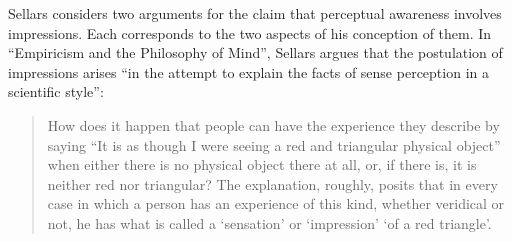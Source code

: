 \documentclass[12pt]{article}
\begin{document}
Sellars considers two arguments for the claim that perceptual awareness involves impressions. Each corresponds to the two aspects of his conception of them. In ``Empiricism and the Philosophy of Mind'', Sellars argues that the postulation of impressions arises ``in the attempt to explain the facts of sense perception in a scientific style'':
\begin{quote}
    How does it happen that people can have the experience they describe by saying ``It is as though I were seeing a red and triangular physical object'' when either there is no physical object there at all, or, if there is, it is neither red nor triangular? The explanation, roughly, posits that in every case in which a person has an experience of this kind, whether veridical or not, he has what is called a `sensation' or `impression' `of a red triangle'.
\end{quote}
\end{document}
